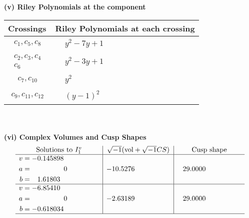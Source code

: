 \documentclass[1p]{elsarticle_modified}
\theoremstyle{definition}
\newcommand{\I}{\sqrt{-1}}
\begin{document}
\newpage\renewcommand{\arraystretch}{1}
\flushleft \textbf{(v) Riley Polynomials at the component}\newline \\
\begin{tabular}{m{50pt}|m{274pt}}
Crossings & \hspace{64pt}Riley Polynomials at each crossing \\
\hline $$\begin{aligned}c_{1},c_{5},c_{8}\end{aligned}$$&$\begin{aligned}
&y^2-7 y+1
\end{aligned}$\\
\hline $$\begin{aligned}c_{2},c_{3},c_{4}\\c_{6}\end{aligned}$$&$\begin{aligned}
&y^2-3 y+1
\end{aligned}$\\
\hline $$\begin{aligned}c_{7},c_{10}\end{aligned}$$&$\begin{aligned}
&y^2
\end{aligned}$\\
\hline $$\begin{aligned}c_{9},c_{11},c_{12}\end{aligned}$$&$\begin{aligned}
&(y-1)^2
\end{aligned}$\\
\hline
\end{tabular}\\~\\
\newpage\flushleft \textbf{(vi) Complex Volumes and Cusp Shapes}
$$\begin{array}{c|c|c}  
\text{Solutions to }I^v_{1}& \I (\text{vol} + \sqrt{-1}CS) & \text{Cusp shape}\\
 \hline 
\begin{aligned}
v &= -0.145898\phantom{ +0.000000I} \\
a &= \phantom{-0.000000 } 0 \\
b &= \phantom{-}1.61803\phantom{ +0.000000I}\end{aligned}
 & -10.5276\phantom{ +0.000000I} & \phantom{-}29.0000\phantom{ +0.000000I} \\ \hline\begin{aligned}
v &= -6.85410\phantom{ +0.000000I} \\
a &= \phantom{-0.000000 } 0 \\
b &= -0.618034\phantom{ +0.000000I}\end{aligned}
 & -2.63189\phantom{ +0.000000I} & \phantom{-}29.0000\phantom{ +0.000000I}\\
 \hline 
 \end{array}$$\newpage
\end{document}
